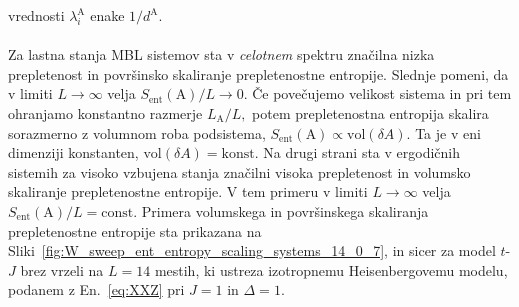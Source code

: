 vrednosti $\lambda_i^\mathrm{A}$ enake $1/d^\mathrm{A}.$ \\\\
Za lastna stanja MBL sistemov sta v \emph{celotnem} spektru značilna nizka prepletenost in površinsko skaliranje prepletenostne entropije. Slednje pomeni, da v limiti $L\to\infty$ velja $S_\mathrm{ent}(\mathrm{A})/L\to0$. Če povečujemo velikost sistema in pri tem ohranjamo konstantno razmerje $L_\mathrm{A}/L,$ potem prepletenostna entropija skalira sorazmerno z volumnom roba podsistema, $S_\mathrm{ent}(\mathrm{A})\propto\mathrm{vol}\left(\delta A\right).$ Ta je v eni dimenziji konstanten, $\mathrm{vol}\left(\delta A\right)=\mathrm{konst}.$ Na drugi strani sta v ergodičnih sistemih za visoko vzbujena stanja značilni visoka prepletenost in volumsko skaliranje prepletenostne entropije. V tem primeru v limiti $L\to\infty$ velja $S_\mathrm{ent}(\mathrm{A})/L=\mathrm{const.}$ Primera volumskega in površinskega skaliranja prepletenostne entropije sta prikazana na Sliki~\ref{fig:W_sweep_ent_entropy_scaling_systems_14_0_7}, in sicer za model $t$-$J$ brez vrzeli na $L=14$ mestih, ki ustreza izotropnemu Heisenbergovemu modelu, podanem z En.~\eqref{eq:XXZ} pri $J=1$ in $\Delta=1.$
